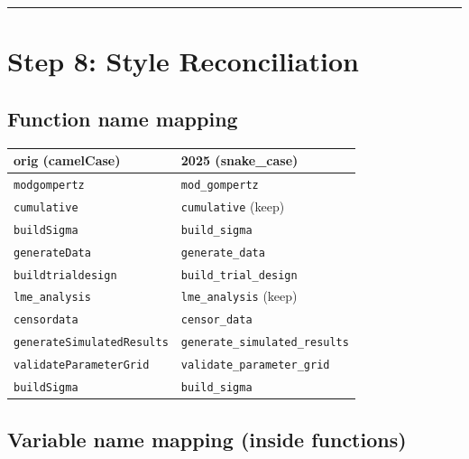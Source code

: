 \documentclass[11pt]{article}
\begin{document}
\bigskip\noindent\rule{\textwidth}{0.4pt}\bigskip

\section{Step 8: Style Reconciliation}

\subsection{Function name mapping}

\begin{table}[h]
\centering
\begin{tabular}{ll}
\toprule
orig (camelCase) & 2025 (snake\_case) \\
\midrule
\texttt{modgompertz} & \texttt{mod\_gompertz} \\
\texttt{cumulative} & \texttt{cumulative} (keep) \\
\texttt{buildSigma} & \texttt{build\_sigma} \\
\texttt{generateData} & \texttt{generate\_data} \\
\texttt{buildtrialdesign} & \texttt{build\_trial\_design} \\
\texttt{lme\_analysis} & \texttt{lme\_analysis} (keep) \\
\texttt{censordata} & \texttt{censor\_data} \\
\texttt{generateSimulatedResults} & \texttt{generate\_simulated\_results} \\
\texttt{validateParameterGrid} & \texttt{validate\_parameter\_grid} \\
\texttt{buildSigma} & \texttt{build\_sigma} \\
\bottomrule
\end{tabular}
\end{table}

\subsection{Variable name mapping (inside functions)}
\end{document}

